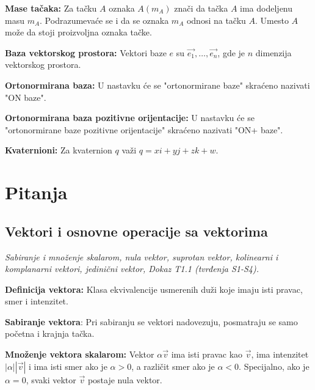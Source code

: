 \documentclass[12pt]{article}
\newcommand{\vek}[1]{\overrightarrow{#1}}
\begin{document}
\par

\textbf{Mase tačaka:} Za tačku $A$ oznaka $A(m_A)$ znači da tačka $A$ ima
dodeljenu masu $m_A$. Podrazumevaće se i da se oznaka $m_A$ odnosi na tačku
$A$. Umesto $A$ može da stoji proizvoljna oznaka tačke.

\par

\textbf{Baza vektorskog prostora:} Vektori baze $e$ su
$\vek{e_1},\dotsc,\vek{e_n}$, gde je $n$ dimenzija vektorskog prostora.

\par

\textbf{Ortonormirana baza:} U nastavku će se "ortonormirane baze" skraćeno
nazivati "ON baze".

\par

\textbf{Ortonormirana baza pozitivne orijentacije:} U nastavku će se
"ortonormirane baze pozitivne orijentacije" skraćeno nazivati "ON+ baze".

\par

\textbf{Kvaternioni:} Za kvaternion $q$ važi $q=xi+yj+zk+w$.

\newpage

\section{Pitanja}
\subsection{Vektori i osnovne operacije sa vektorima}
\textit{Sabiranje i množenje skalarom, nula vektor, suprotan vektor, kolinearni
    i komplanarni vektori, jedinični vektor, Dokaz T1.1 (tvrđenja S1-S4).}
\par
\vspace*{1cm}

\textbf{Definicija vektora:} Klasa ekvivalencije usmerenih duži koje imaju isti
pravac, smer i intenzitet.
\par

\textbf{Sabiranje vektora}: Pri sabiranju se vektori nadovezuju, posmatraju se
samo početna i krajnja tačka.
\par

\textbf{Množenje vektora skalarom:} Vektor $\alpha\vek{v}$ ima isti pravac
kao $\vek{v}$, ima intenzitet $|\alpha||\vek{v}|$ i ima isti smer ako je
$\alpha>0$, a različit smer ako je $\alpha<0$. Specijalno, ako je $\alpha=0$,
svaki vektor $\vek{v}$ postaje nula vektor.
\par
\end{document}
